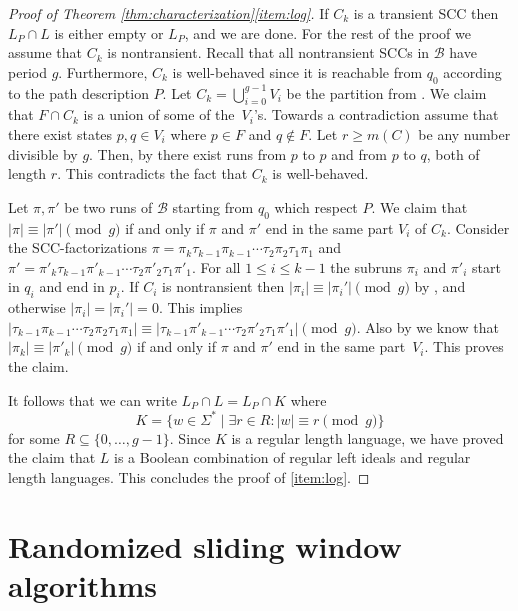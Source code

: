 \documentclass{theoretics}
\newcommand{\B}{\mathcal{B}}
\renewcommand{\geq}{\geqslant}
\renewcommand{\leq}{\leqslant}
\renewcommand{\ge}{\geq}
\renewcommand{\le}{\leq}
\begin{document}
\begin{proof}[Proof of Theorem \ref{thm:characterization}\ref{item:log}]
If $C_k$ is a transient SCC then $L_P \cap L$ is either empty or $L_P$, and we are done.
For the rest of the proof we assume that $C_k$ is nontransient. Recall that all nontransient SCCs in $\B$ have period $g$.
Furthermore, $C_k$ is well-behaved since it is reachable from $q_0$ according to the path description $P$.
Let $C_k = \bigcup_{i=0}^{g-1} V_i$ be the partition from .
We claim that $F \cap C_k$ is a union of some of the~$V_i$'s.
Towards a contradiction assume that there exist states $p,q \in V_i$ where $p \in F$ and $q \notin F$.
Let $r \ge m(C)$ be any number divisible by $g$.
Then, by  there exist runs from $p$ to $p$ and from $p$ to $q$,
both of length $r$. This contradicts the fact that $C_k$ is well-behaved.

Let $\pi, \pi'$ be two runs of $\B$ starting from $q_0$
which respect $P$.
We claim that $|\pi| \equiv |\pi'| \pmod{g}$ if and only if $\pi$ and $\pi'$ end in the same part $V_i$ of $C_k$.
Consider the SCC-factorizations
$\pi = \pi_k \tau_{k-1} \pi_{k-1} \cdots \tau_2 \pi_2 \tau_1 \pi_1$ and
$\pi' = \pi'_k \tau_{k-1} \pi'_{k-1} \cdots \tau_2 \pi'_2 \tau_1 \pi'_1$.
For all $1 \le i \le k-1$ the subruns $\pi_i$ and $\pi'_i$ start in $q_i$ and end in $p_i$.
If $C_i$ is nontransient then $|\pi_i| \equiv |\pi_i'| \pmod{g}$ by ,
and otherwise $|\pi_i| = |\pi_i'| = 0$.
This implies $|\tau_{k-1} \pi_{k-1} \cdots \tau_2 \pi_2 \tau_1 \pi_1| \equiv |\tau_{k-1} \pi'_{k-1} \cdots \tau_2 \pi'_2 \tau_1 \pi'_1| \pmod{g}$.
Also by  we know that $|\pi_k| \equiv |\pi'_k| \pmod{g}$ if and only if
$\pi$ and $\pi'$ end in the same part~$V_i$.
This proves the claim.

It follows that we can write $L_P \cap L = L_P \cap K$ where
\[ K = \{ w \in \Sigma^* \mid \exists r \in R \colon |w| \equiv r \pmod{g} \} \]
for some $R \subseteq \{0, \dots, g-1\}$.
Since $K$ is a regular length language, we have proved the claim that $L$ is a Boolean combination
of regular left ideals and regular length languages.
This concludes the proof of \ref{item:log}.
\end{proof}


\section{Randomized sliding window algorithms}

\label{chap:random}
\end{document}
